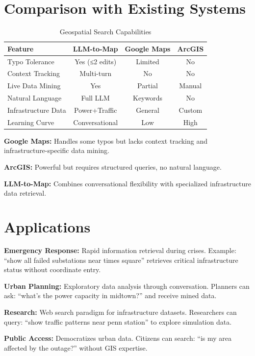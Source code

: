 \documentclass[sigconf]{acmart}
\begin{document}
\section{Comparison with Existing Systems}

\begin{table}[h]
\centering
\caption{Geospatial Search Capabilities}
\small
\begin{tabular}{lccc}
\toprule
\textbf{Feature} & \textbf{LLM-to-Map} & \textbf{Google Maps} & \textbf{ArcGIS} \\
\midrule
Typo Tolerance & Yes (≤2 edits) & Limited & No \\
Context Tracking & Multi-turn & No & No \\
Live Data Mining & Yes & Partial & Manual \\
Natural Language & Full LLM & Keywords & No \\
Infrastructure Data & Power+Traffic & General & Custom \\
Learning Curve & Conversational & Low & High \\
\bottomrule
\end{tabular}
\end{table}

\textbf{Google Maps:} Handles some typos but lacks context tracking and infrastructure-specific data mining.

\textbf{ArcGIS:} Powerful but requires structured queries, no natural language.

\textbf{LLM-to-Map:} Combines conversational flexibility with specialized infrastructure data retrieval.

\section{Applications}

\textbf{Emergency Response:} Rapid information retrieval during crises. Example: ``show all failed substations near times square'' retrieves critical infrastructure status without coordinate entry.

\textbf{Urban Planning:} Exploratory data analysis through conversation. Planners can ask: ``what's the power capacity in midtown?'' and receive mined data.

\textbf{Research:} Web search paradigm for infrastructure datasets. Researchers can query: ``show traffic patterns near penn station'' to explore simulation data.

\textbf{Public Access:} Democratizes urban data. Citizens can search: ``is my area affected by the outage?'' without GIS expertise.
\end{document}
